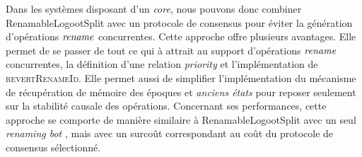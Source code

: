 Dans les systèmes disposant d'un \emph{core}, nous pouvons donc combiner RenamableLogootSplit avec un protocole de consensus pour éviter la génération d'opérations $\mathit{rename}$ concurrentes.
Cette approche offre plusieurs avantages.
Elle permet de se passer de tout ce qui à attrait au support d'opérations $\mathit{rename}$ concurrentes, \ie la définition d'une relation \emph{priority} et l'implémentation de \textsc{revertRenameId}.
Elle permet aussi de simplifier l'implémentation du mécanisme de récupération de mémoire des époques et \emph{anciens états} pour reposer seulement sur la stabilité causale des opérations.
Concernant ses performances, cette approche se comporte de manière similaire à RenamableLogootSplit avec un seul \emph{renaming bot} , mais avec un surcoût correspondant au coût du protocole de consensus sélectionné.
